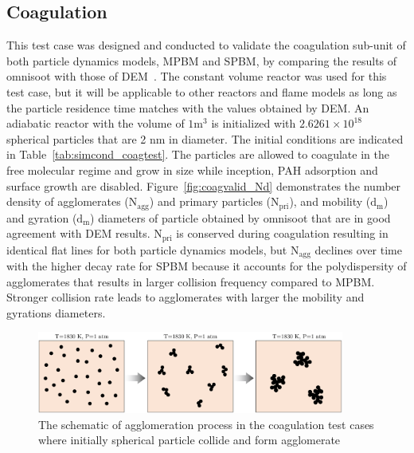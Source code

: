 \subsection{Coagulation}
This test case was designed and conducted to validate the coagulation sub-unit of both particle dynamics models, MPBM and SPBM, by comparing the results of omnisoot with those of DEM~\citep{kholghy2021surface}. The constant volume reactor was used for this test case, but it will be applicable to other reactors and flame models as long as the particle residence time matches with the values obtained by DEM. An adiabatic reactor with the volume of $1 \mathrm{m^3}$ is initialized with $2.6261\times10^{18}$ spherical particles that are 2 nm in diameter. The initial conditions are indicated in Table~\ref{tab:simcond_coagtest}. The particles are allowed to coagulate in the free molecular regime and grow in size while inception, PAH adsorption and surface growth are disabled. Figure~\ref{fig:coagvalid_Nd} demonstrates the number density of agglomerates ($\mathrm{N_{agg}}$) and primary particles ($\mathrm{N_{pri}}$), and mobility ($\mathrm{d_m}$) and gyration ($\mathrm{d_m}$) diameters of particle obtained by omnisoot that are in good agreement with DEM results. $\mathrm{N_{pri}}$ is conserved during coagulation resulting in identical flat lines for both particle dynamics models, but $\mathrm{N_{agg}}$ declines over time with the higher decay rate for SPBM because it accounts for the polydispersity of agglomerates that results in larger collision frequency compared to MPBM. Stronger collision rate leads to agglomerates with larger the mobility and gyrations diameters.

\begin{figure}[H]
	\centering
	\includegraphics[width=0.9\textwidth]{Figures/Results/Validation/Coagulation/coagulation_scheme.pdf}
	\caption{The schematic of agglomeration process in the coagulation test cases where initially spherical particle collide and form agglomerate}
	\label{fig:coagscheme}
\end{figure}

